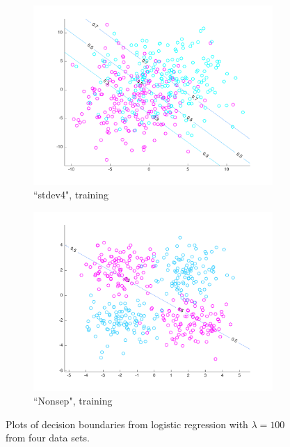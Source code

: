 \begin{figure}[h!]
\begin{subfigure}[b]{0.22\textwidth}
	\includegraphics[scale=0.25]{hw2_1_stdev4_a_100.pdf}
	\caption{``stdev4", training}\label{fig:data_stdev4_a_100}
    \end{subfigure}  
    \quad
    \begin{subfigure}[b]{0.22\textwidth}
	\includegraphics[scale=0.25]{hw2_1_nonsep_a_100.pdf}
	\caption{``Nonsep", training}\label{fig:data_nonsep_a_100}
    \end{subfigure}  
    \caption{Plots of decision boundaries from logistic regression with $\lambda = 100$ from four data sets.}  \label{fig:LR_plots_100}  
\end{figure}


